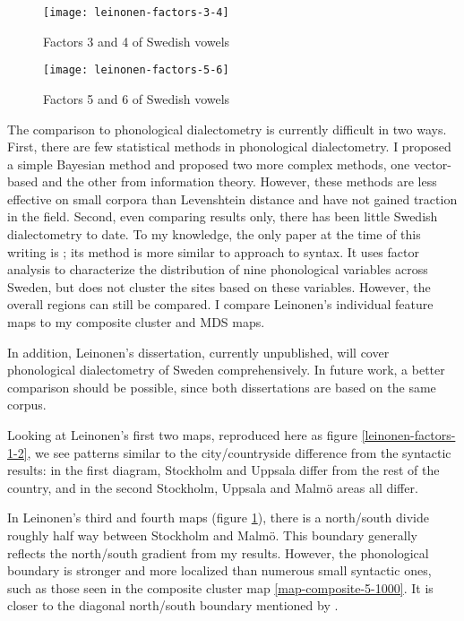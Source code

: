 \begin{figure}
  \texttt{[image: leinonen-factors-3-4]}
  \caption{Factors 3 and 4 of Swedish vowels}
  \label{leinonen-factors-3-4}
\end{figure}

\begin{figure}
  \texttt{[image: leinonen-factors-5-6]}
  \caption{Factors 5 and 6 of Swedish vowels}
  \label{leinonen-factors-5-6}
\end{figure}

The comparison to phonological dialectometry is currently difficult in
two ways. First, there are few statistical methods in phonological
dialectometry. I proposed a simple Bayesian method \cite{sanders06}
and  proposed two more complex methods, one
vector-based and the other from information theory. However, these
methods are less effective on small corpora than Levenshtein distance
and have not gained traction in the field.  Second, even comparing
results only, there has been little Swedish dialectometry to date. To
my knowledge, the only paper at the time of this writing is
; its method is more similar to
 approach to syntax. It uses factor analysis to
characterize the distribution of nine phonological variables across
Sweden, but does not cluster the sites based on these
variables. However, the overall regions can still be compared. I
compare Leinonen's individual feature maps to my composite cluster and
MDS maps.

In addition, Leinonen's dissertation, currently unpublished, will
cover phonological dialectometry of Sweden comprehensively. In future
work, a better comparison should be possible, since both dissertations
are based on the same corpus.

Looking at Leinonen's first two maps, reproduced here as figure
\ref{leinonen-factors-1-2}, we see patterns similar to the
city/countryside difference from the syntactic results: in the first diagram,
Stockholm and Uppsala differ from the rest of the country, and in the
second Stockholm, Uppsala and Malm\"o areas all differ.

In Leinonen's third and fourth maps (figure \ref{leinonen-factors-3-4}),
there is a north/south divide roughly half way between Stockholm and
Malm\"o. This boundary generally reflects the north/south
gradient from my results. However, the phonological boundary is stronger and more
localized than numerous small syntactic ones, such as those seen in
the composite cluster map \ref{map-composite-5-1000}. It is closer to
the diagonal north/south boundary mentioned by .

